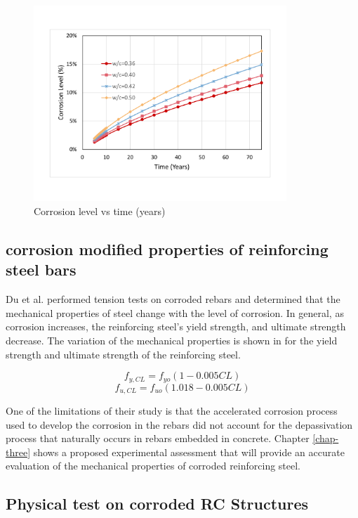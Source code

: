 \begin{figure}[htbp]
\centering
\includegraphics[width=0.85\textwidth]{Chapter-2/figs/CorrosionLevel}
\caption{Corrosion level vs time (years)}
\label{fig:CorrosionLevel_Time}
\end{figure}

\subsection{corrosion modified properties of reinforcing steel bars}

Du et al. \cite{Du2005}\cite{Du2005b} performed tension tests on corroded rebars and determined that the mechanical properties of steel change with the level of corrosion. In general, as corrosion increases, the reinforcing steel's yield strength, and ultimate strength decrease. The variation of the mechanical properties is shown in  for the yield strength and ultimate strength of the reinforcing steel.

\begin{equation}
  f_{y,CL}=f_{yo}(1-0.005CL)
  \label{eq.eleven}
\end{equation} 
\[
  f_{u,CL}=f_{uo}(1.018-0.005CL)
\]

One of the limitations of their study is that the accelerated corrosion process used to develop the corrosion in the rebars did not account for the depassivation process that naturally occurs in rebars embedded in concrete. Chapter \ref{chap-three} shows a proposed experimental assessment that will provide an accurate evaluation of the mechanical properties of corroded reinforcing steel. 

\subsection{Physical test on corroded RC Structures}

